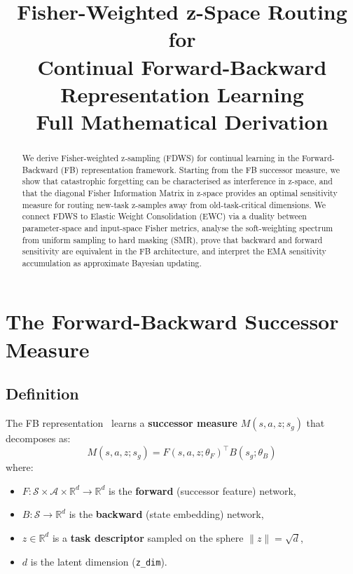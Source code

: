 \documentclass[11pt]{article}
\title{\textbf{Fisher-Weighted z-Space Routing for\\Continual Forward-Backward Representation Learning}\\[6pt]
{\large Full Mathematical Derivation}}
\author{}
\date{}
\newcommand{\R}{\mathbb{R}}
\begin{document}
\maketitle

\begin{abstract}
We derive Fisher-weighted z-sampling (FDWS) for continual learning in the Forward-Backward (FB) representation framework. Starting from the FB successor measure, we show that catastrophic forgetting can be characterised as interference in z-space, and that the diagonal Fisher Information Matrix in z-space provides an optimal sensitivity measure for routing new-task z-samples away from old-task-critical dimensions. We connect FDWS to Elastic Weight Consolidation (EWC) via a duality between parameter-space and input-space Fisher metrics, analyse the soft-weighting spectrum from uniform sampling to hard masking (SMR), prove that backward and forward sensitivity are equivalent in the FB architecture, and interpret the EMA sensitivity accumulation as approximate Bayesian updating.
\end{abstract}

\tableofcontents
\vspace{1em}

\section{The Forward-Backward Successor Measure}

\subsection{Definition}

The FB representation~\cite{touati2021learning} learns a \textbf{successor measure} $M(s, a, z; s_g)$ that decomposes as:
\begin{equation}\label{eq:fb}
    M(s, a, z; s_g) = F(s, a, z; \theta_F)^\top B(s_g; \theta_B)
\end{equation}
where:
\begin{itemize}[nosep]
    \item $F: \mathcal{S} \times \mathcal{A} \times \R^d \to \R^d$ is the \textbf{forward} (successor feature) network,
    \item $B: \mathcal{S} \to \R^d$ is the \textbf{backward} (state embedding) network,
    \item $z \in \R^d$ is a \textbf{task descriptor} sampled on the sphere $\|z\| = \sqrt{d}$,
    \item $d$ is the latent dimension (\texttt{z\_dim}).
\end{itemize}
\end{document}
